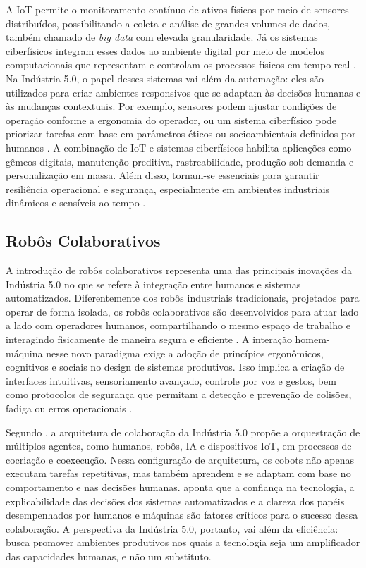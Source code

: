 A IoT permite o monitoramento contínuo de ativos físicos por meio de sensores distribuídos, possibilitando a coleta e análise de grandes volumes de dados, também chamado de \textit{big data} com elevada granularidade.
Já os sistemas ciberfísicos integram esses dados ao ambiente digital por meio de modelos computacionais que representam e controlam os processos físicos em tempo real \cite{TOTH2023}.
Na Indústria 5.0, o papel desses sistemas vai além da automação: eles são utilizados para criar ambientes responsivos que se adaptam às decisões humanas e às mudanças contextuais.
Por exemplo, sensores podem ajustar condições de operação conforme a ergonomia do operador, ou um sistema ciberfísico pode priorizar tarefas com base em parâmetros éticos ou socioambientais definidos por humanos \cite{TOTH2023}.
A combinação de \gls{IoT} e sistemas ciberfísicos habilita aplicações como gêmeos digitais, manutenção preditiva, rastreabilidade, produção sob demanda e personalização em massa.
Além disso, tornam-se essenciais para garantir resiliência operacional e segurança, especialmente em ambientes industriais dinâmicos e sensíveis ao tempo \cite{VALETTE2023}.

\subsection{Robôs Colaborativos}

A introdução de robôs colaborativos representa uma das principais inovações da Indústria 5.0 no que se refere à integração entre humanos e sistemas automatizados.
Diferentemente dos robôs industriais tradicionais, projetados para operar de forma isolada, os robôs colaborativos são desenvolvidos para atuar lado a lado com operadores humanos, compartilhando o mesmo espaço de trabalho e interagindo fisicamente de maneira segura e eficiente \cite{PIZON2023, TOTH2023}.
A interação homem-máquina nesse novo paradigma exige a adoção de princípios ergonômicos, cognitivos e sociais no design de sistemas produtivos.
Isso implica a criação de interfaces intuitivas, sensoriamento avançado, controle por voz e gestos, bem como protocolos de segurança que permitam a detecção e prevenção de colisões, fadiga ou erros operacionais \cite{TOTH2023, YANG2024}.

Segundo , a arquitetura de colaboração da Indústria 5.0 propõe a orquestração de múltiplos agentes, como humanos, robôs, \gls{IA} e dispositivos \gls{IoT}, em processos de cocriação e coexecução.
Nessa configuração de arquitetura, os cobots não apenas executam tarefas repetitivas, mas também aprendem e se adaptam com base no comportamento e nas decisões humanas.
 aponta que a confiança na tecnologia, a explicabilidade das decisões dos sistemas automatizados e a clareza dos papéis desempenhados por humanos e máquinas são fatores críticos para o sucesso dessa colaboração.
A perspectiva da Indústria 5.0, portanto, vai além da eficiência: busca promover ambientes produtivos nos quais a tecnologia seja um amplificador das capacidades humanas, e não um substituto.


